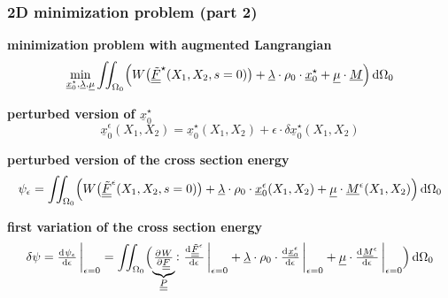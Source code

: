 \begin{frame}
  \frametitle{2D minimization problem (part 2)}

  \textbf{minimization problem with augmented Langrangian}
  \begin{displaymath}
    \min_{\underline{x}_0^{\star},\underline{\lambda},\underline{\mu}} \iint_{\Omega_0} \Bigl( W \bigl( \doubleunderline{\tilde{F}}^{\star}(X_1,X_2,s=0) \bigr) + \underline{\lambda} \cdot \rho_0 \cdot \underline{x}_0^{\star} + \underline{\mu} \cdot \underline{M} \Bigr) \dif \Omega_0
  \end{displaymath}
  
  \vspace{0.5em}
  \textbf{perturbed version of $\underline{x}_0^{\star}$}
  \begin{displaymath}
    \underline{x}_0^{\epsilon}(X_1,X_2) = \underline{x}_0^{\star}(X_1,X_2) + \epsilon \cdot \delta \underline{x}_0^{\star}(X_1,X_2)
  \end{displaymath}
  
  \vspace{0.5em}
  \textbf{perturbed version of the cross section energy}
  \begin{displaymath}
    \psi_{\epsilon} = 
    \iint_{\Omega_0} \Bigl(
      W \bigl( \doubleunderline{\tilde{F}}^{\epsilon}(X_1,X_2,s=0) \bigr) + 
      \underline{\lambda} \cdot \rho_0 \cdot \underline{x}_0^{\epsilon}(X_1,X_2) +
      \underline{\mu} \cdot \underline{M}^{\epsilon}(X_1,X_2)
    \Bigr) \dif \Omega_0
  \end{displaymath}
  
  \vspace{0.5em}
  \textbf{first variation of the cross section energy}
  \begin{displaymath}
    \delta \psi = \od{\psi_{\epsilon}}{\epsilon} \sVert[3]_{\epsilon=0} =
    \iint_{\Omega_0} \Bigl(
      \underbrace{\pd{W}{\doubleunderline{F}}}_{\doubleunderline{P}} \colon \od{\doubleunderline{\tilde{F}}^{\epsilon}}{\epsilon} \sVert[3]_{\epsilon=0} +
      \underline{\lambda} \cdot \rho_0 \cdot \od{\underline{x}_0^{\epsilon}}{\epsilon} \sVert[3]_{\epsilon=0} +
      \underline{\mu} \cdot \od{\underline{M}^{\epsilon}}{\epsilon} \sVert[3]_{\epsilon=0}
    \Bigr) \dif \Omega_0
  \end{displaymath}
  
\end{frame}


